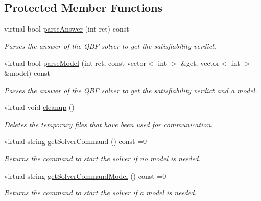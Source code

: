 \subsection*{Protected Member Functions}
\begin{DoxyCompactItemize}
\item 
virtual bool \hyperlink{classExtQBFSolver_a11ddbf3980824453238071e8a036f804}{parse\-Answer} (int ret) const 
\begin{DoxyCompactList}\small\item\em Parses the answer of the Q\-B\-F solver to get the satisfiability verdict. \end{DoxyCompactList}\item 
virtual bool \hyperlink{classExtQBFSolver_afe52ff8faa21fbdd850b73e8f8cf9839}{parse\-Model} (int ret, const vector$<$ int $>$ \&get, vector$<$ int $>$ \&model) const 
\begin{DoxyCompactList}\small\item\em Parses the answer of the Q\-B\-F solver to get the satisfiability verdict and a model. \end{DoxyCompactList}\item 
virtual void \hyperlink{classExtQBFSolver_a3ee48837c5e937e4d3a5b3c2a6b761d3}{cleanup} ()
\begin{DoxyCompactList}\small\item\em Deletes the temporary files that have been used for communication. \end{DoxyCompactList}\item 
virtual string \hyperlink{classExtQBFSolver_aec4c2d830f72283e2fbabf4a3f62a640}{get\-Solver\-Command} () const =0
\begin{DoxyCompactList}\small\item\em Returns the command to start the solver if no model is needed. \end{DoxyCompactList}\item 
virtual string \hyperlink{classExtQBFSolver_ac2bc9e4817cfa1a54195d7d9f1c7d3bd}{get\-Solver\-Command\-Model} () const =0
\begin{DoxyCompactList}\small\item\em Returns the command to start the solver if a model is needed. \end{DoxyCompactList}\end{DoxyCompactItemize}
